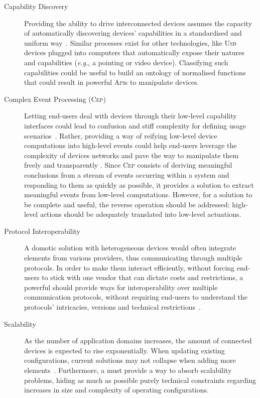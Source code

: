 \begin{description}
	\item[Capability Discovery] Providing the ability to drive interconnected devices assumes the capacity of automatically discovering devices' capabilities in a standardised and uniform way~\cite{chaqfeh-12}. Similar processes exist for other technologies, like \textsc{Usb} devices plugged into computers that automatically expose their natures and capabilities (\textit{e.g.}, a pointing or video device). Classifying such capabilities could be useful to build an ontology of normalised functions that could result in powerful \textsc{Api}s to manipulate devices. 
		
	\item[Complex Event Processing (\textsc{Cep})] Letting end-users deal with devices through their low-level capability interfaces could lead to confusion and stiff complexity for defining usage scenarios~\cite{ma-13}. Rather, providing a way of reifying low-level device computations into high-level events could help end-users leverage the complexity of devices networks and pave the way to manipulate them freely and transparently \cite{J:Cugola-Margara:2012}. Since \textsc{Cep} consists of deriving meaningful conclusions from a stream of events occurring within a system and responding to them as quickly as possible, it provides a solution to extract meaningful events from low-level computations. However, for a solution to be complete and useful, the reverse operation should be addressed: high-level actions should be adequately translated into low-level actuations. 
		
	\item[Protocol Interoperability] A domotic solution with heterogeneous devices would often integrate elements from various providers, thus communicating through multiple protocols. In order to make them interact efficiently, without forcing end-users to stick with one vendor that can dictate costs and restrictions, a powerful \DSL should provide ways for interoperability over multiple communication protocols, without requiring end-users to understand the protocols' intricacies, versions and technical restrictions~\cite{gubbi-13}.
	
	\item[Scalability] As the number of application domains increases, the amount of connected devices is expected to rise exponentially. When updating existing \IOT configurations, current solutions may not collapse when adding more elements~\cite{mukho-14}. Furthermore, a \DSL must provide a way to absorb scalability problems, hiding as much as possible purely technical constraints regarding increases in size and complexity of operating configurations. 
	

\end{description}
